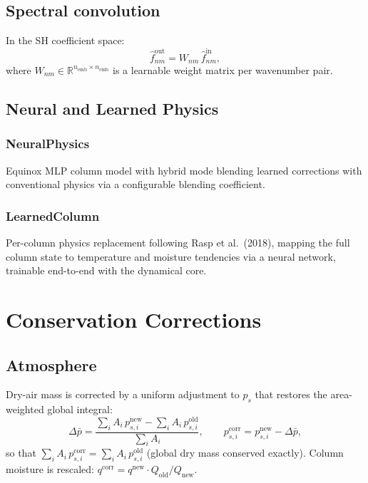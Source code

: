 \documentclass[11pt,a4paper]{article}
\begin{document}
\subsection{Spectral convolution}
In the SH coefficient space:
\begin{equation}
  \hat f_{nm}^{\mathrm{out}} = W_{nm}\,\hat f_{nm}^{\mathrm{in}},
\end{equation}
where $W_{nm}\in\mathbb R^{n_{\mathrm{emb}}\times n_{\mathrm{emb}}}$ is a learnable weight matrix per wavenumber pair.

\subsection{Neural and Learned Physics}

\subsubsection{NeuralPhysics}
Equinox MLP column model with hybrid mode blending learned corrections with conventional physics via a configurable blending coefficient.

\subsubsection{LearnedColumn}
Per-column physics replacement following Rasp et al.\ (2018), mapping the full column state to temperature and moisture tendencies via a neural network, trainable end-to-end with the dynamical core.

\section{Conservation Corrections}

\subsection{Atmosphere}
Dry-air mass is corrected by a uniform adjustment to $p_s$ that restores the area-weighted global integral:
\begin{equation}
  \Delta\bar p = \frac{\sum_i A_i\,p_{s,i}^{\mathrm{new}} - \sum_i A_i\,p_{s,i}^{\mathrm{old}}}{\sum_i A_i},
  \qquad
  p_{s,i}^{\mathrm{corr}} = p_{s,i}^{\mathrm{new}} - \Delta\bar p,
\end{equation}
so that $\sum_i A_i\,p_{s,i}^{\mathrm{corr}}=\sum_i A_i\,p_{s,i}^{\mathrm{old}}$ (global dry mass conserved exactly).
Column moisture is rescaled: $q^{\mathrm{corr}}=q^{\mathrm{new}}\cdot Q_{\mathrm{old}}/Q_{\mathrm{new}}$.
\end{document}
